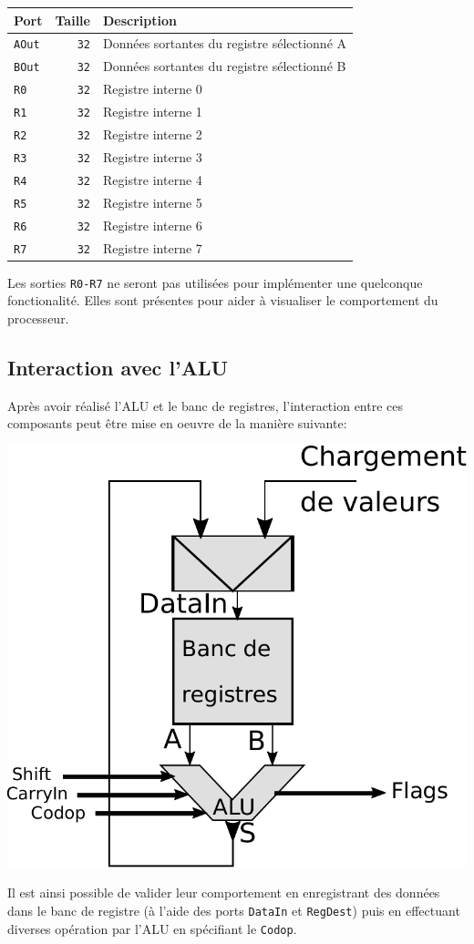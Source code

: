 \begin{tabular}{|l|r|l|}
\hline 
\textbf{Port} & \textbf{Taille} & \textbf{Description}\\
\hline

\texttt{AOut}	& \texttt{32} & Données sortantes du registre sélectionné A\\
\hline
\texttt{BOut}	& \texttt{32} & Données sortantes du registre sélectionné B\\
\hline
\texttt{R0}	& \texttt{32} & Registre interne 0\\
\hline
\texttt{R1}	& \texttt{32} & Registre interne 1\\
\hline
\texttt{R2}	& \texttt{32} & Registre interne 2\\
\hline
\texttt{R3}	& \texttt{32} & Registre interne 3\\
\hline
\texttt{R4}	& \texttt{32} & Registre interne 4\\
\hline
\texttt{R5}	& \texttt{32} & Registre interne 5\\
\hline
\texttt{R6}	& \texttt{32} & Registre interne 6\\
\hline
\texttt{R7}	& \texttt{32} & Registre interne 7\\

\hline
\end{tabular}

Les sorties \texttt{R0-R7} ne seront pas utilisées pour implémenter une quelconque fonctionalité. Elles sont présentes pour aider à visualiser le comportement du processeur.

\subsection{Interaction avec l'ALU}

Après avoir réalisé l'ALU et le banc de registres, l'interaction entre ces composants peut être mise en oeuvre de la manière suivante:

\hspace{14em}\includegraphics[scale=0.5]{pictures/ALU_Registers.pdf}

Il est ainsi possible de valider leur comportement en enregistrant des données dans le banc de registre (à l'aide des ports \texttt{DataIn} et \texttt{RegDest})
puis en effectuant diverses opération par l'ALU en spécifiant  le \texttt{Codop}.
